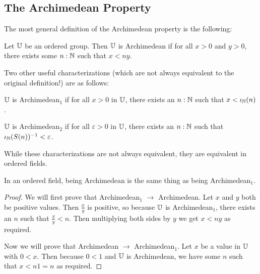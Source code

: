\documentclass[../math.tex]{subfiles}
\begin{document}
\subsection{The Archimedean Property}

The most general definition of the Archimedean property is the following:

\begin{class}
    Let $\mathbb{U}$ be an ordered group.  Then $\mathbb{U}$ is Archimedean if for all $x > 0$
    and $y > 0$, there exists some $n : \mathbb{N}$ such that $x < ny$.
\end{class}

Two other useful characterizations (which are not always equivalent to the
original definition!) are as follows:

\begin{definition}
    $\mathbb{U}$ is Archimedean$_1$ if for all $x > 0$ in $\mathbb{U}$, there exists an $n : \mathbb{N}$
    such that $x < \iota_{\mathbb{N}}(n)$.
\end{definition}

\begin{definition}
    $\mathbb{U}$ is Archimedean$_2$ if for all $\varepsilon > 0$ in $\mathbb{U}$, there exists
    an $n : \mathbb{N}$ such that $\iota_{\mathbb{N}}(S(n))^{-1} < \varepsilon$.
\end{definition}

While these characterizations are not always equivalent, they are equivalent in
ordered fields.

\begin{theorem}
    In an ordered field, being Archimedean is the same thing as being
    Archimedean$_1$.
\end{theorem}
\begin{proof}
    We will first prove that Archimedean$_1$ $\rightarrow$ Archimedean.  Let $x$
    and $y$ both be positive values.  Then $\frac{x}{y}$ is positive, so because
    $\mathbb{U}$ is Archimedean$_1$, there exists an $n$ such that $\frac{x}{y} < n$.
    Then multiplying both sides by $y$ we get $x < ny$ as required.

    Now we will prove that Archimedean $\rightarrow$ Archimedean$_1$.  Let $x$
    be a value in $\mathbb{U}$ with $0 < x$.  Then because $0 < 1$ and $\mathbb{U}$ is
    Archimedean, we have some $n$ such that $x < n1 = n$ as required.
\end{proof}
\end{document}
